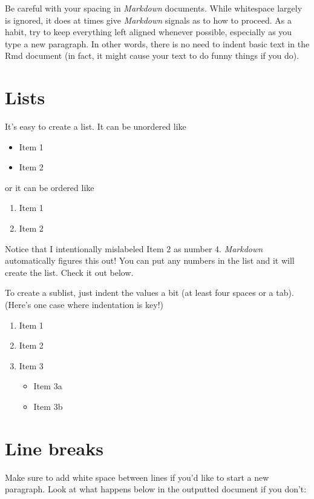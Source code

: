 \documentclass[12pt,twoside]{reedthesis}
\providecommand{\tightlist}{%
  \setlength{\itemsep}{0pt}\setlength{\parskip}{0pt}}
\begin{document}
Be careful with your spacing in \emph{Markdown} documents. While whitespace largely is ignored, it does at times give \emph{Markdown} signals as to how to proceed. As a habit, try to keep everything left aligned whenever possible, especially as you type a new paragraph. In other words, there is no need to indent basic text in the Rmd document (in fact, it might cause your text to do funny things if you do).

\section{Lists}\label{lists}

It's easy to create a list. It can be unordered like
\begin{itemize}
\tightlist
\item
  Item 1
\item
  Item 2
\end{itemize}
or it can be ordered like
\begin{enumerate}
\def\labelenumi{\arabic{enumi}.}
\tightlist
\item
  Item 1
\item
  Item 2
\end{enumerate}
Notice that I intentionally mislabeled Item 2 as number 4. \emph{Markdown} automatically figures this out! You can put any numbers in the list and it will create the list. Check it out below.

To create a sublist, just indent the values a bit (at least four spaces or a tab). (Here's one case where indentation is key!)
\begin{enumerate}
\def\labelenumi{\arabic{enumi}.}
\tightlist
\item
  Item 1
\item
  Item 2
\item
  Item 3
  \begin{itemize}
  \tightlist
  \item
    Item 3a
  \item
    Item 3b
  \end{itemize}
\end{enumerate}
\section{Line breaks}\label{line-breaks}

Make sure to add white space between lines if you'd like to start a new paragraph. Look at what happens below in the outputted document if you don't:
\end{document}
